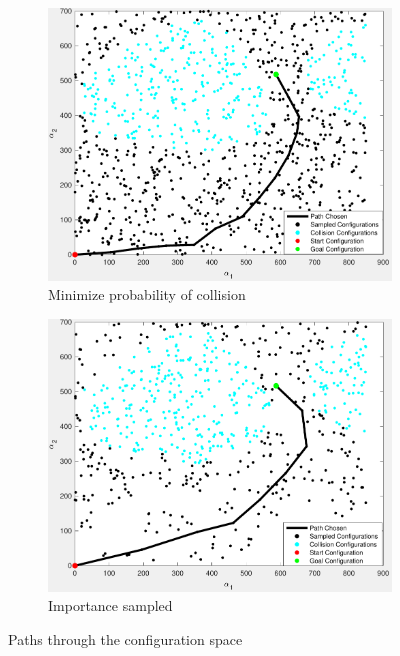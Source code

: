 \documentclass[letterpaper, 10 pt, conference]{ieeeconf}  %
\begin{document}
\begin{figure}[thpb]
        \begin{subfigure}[b]{1.4in} 
                \centering
                \includegraphics[width=\textwidth]{figures/path/path3.pdf}
                \caption{Minimize probability of collision}
                \label{fig:path3}
        \end{subfigure}
        \begin{subfigure}[b]{1.4in}                            
                \centering
                \includegraphics[width=\textwidth]{figures/path/path4.pdf}
                \caption{Importance sampled}
                \label{fig:path4}
        \end{subfigure}
        \caption{Paths through the configuration space}
        \label{fig:path}
\end{figure}
\end{document}

